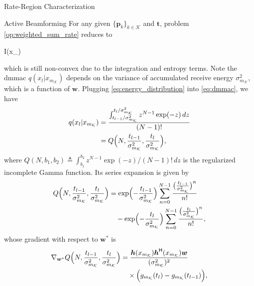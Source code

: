 \documentclass[journal]{IEEEtran}
\begin{document}
\begin{section}{Rate-Region Characterization}
	\begin{subsection}{Active Beamforming}
		For any given $\{\boldsymbol{p}_k\}_{k \in \mathcal{K}}$ and $\boldsymbol{t}$, problem \eqref{op:weighted_sum_rate} reduces to
		\begin{maxi!}
			{}{I(x_{})}{\label{op:active_beamforming}}{\label{ob:active_beamforming}}
			\addConstraint{\eqref{co:transmit_power},}
		\end{maxi!}
		which is still non-convex due to the integration and entropy terms.
		Note the \gls{dmmac} $q(x_l|x_{m_{\mathcal{K}}})$ depends on the variance of accumulated receive energy $\sigma_{m_{\mathcal{K}}}^2$, which is a function of $\boldsymbol{w}$.
		Plugging \eqref{eq:energy_distribution} into \eqref{eq:dmmac}, we have
		\begin{align}
			q(x_l|x_{m_{\mathcal{K}}})
			 & = \frac{\int_{{t_{l-1}}/{\sigma_{m_{\mathcal{K}}}^2}}^{{t_l}/{\sigma_{m_{\mathcal{K}}}^2}} z^{N-1} \exp(-z) \, d z}{(N-1)!} \\
			 & = Q\Bigl(N,\frac{t_{l-1}}{\sigma_{m_{\mathcal{K}}}^2},\frac{t_l}{\sigma_{m_{\mathcal{K}}}^2}\Bigr),
			\label{eq:dmmac_gamma}
		\end{align}
		where $Q(N, b_1, b_2) \triangleq \int_{b_1}^{b_2} z^{N-1} \exp(-z) / (N - 1)! \, d z$ is the regularized incomplete Gamma function.
		Its series expansion is given by \cite[Theorem 3]{Jameson2016}
		\begin{align}
			Q\Bigl(N,\frac{t_{l-1}}{\sigma_{m_{\mathcal{K}}}^2},\frac{t_l}{\sigma_{m_{\mathcal{K}}}^2}\Bigr)
			 & = \exp \Bigl(-\frac{t_{l-1}}{\sigma_{m_{\mathcal{K}}}^2}\Bigr) \sum_{n=0}^{N-1} \frac{\bigl(\frac{t_{l-1}}{\sigma_{m_{\mathcal{K}}}^2}\bigr)^n}{n!} \nonumber \\
			 & \quad - \exp \Bigl(-\frac{t_l}{\sigma_{m_{\mathcal{K}}}^2}\Bigr) \sum_{n=0}^{N-1} \frac{\bigl(\frac{t_l}{\sigma_{m_{\mathcal{K}}}^2}\bigr)^n}{n!},
			\label{eq:regularized_incomplete_gamma}
		\end{align}
		whose gradient with respect to $\boldsymbol{w}^*$ is
		\begin{align}
			\nabla_{\boldsymbol{w}^*} Q\Bigl(N,\frac{t_{l-1}}{\sigma_{m_{\mathcal{K}}}^2},\frac{t_l}{\sigma_{m_{\mathcal{K}}}^2}\Bigr)
			 & = \frac{\boldsymbol{h}(x_{m_{\mathcal{K}}})\boldsymbol{h}^\mathsf{H}(x_{m_{\mathcal{K}}})\boldsymbol{w}}{(\sigma_{m_{\mathcal{K}}}^2)^2} \nonumber \\
			 & \quad \times \Bigl(g_{m_{\mathcal{K}}}(t_l) - g_{m_{\mathcal{K}}}(t_{l-1})\Bigr),
			\label{eq:regularized_incomplete_gamma_gradient}

\end{align}
\end{subsection}
\end{section}
\end{document}
